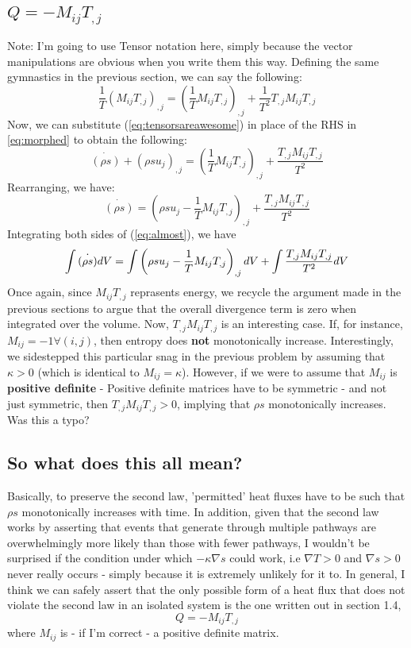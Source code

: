 \documentclass[english]{article}
\begin{document}
\subsection{$Q = - M_{ij} T_{,j}$}
Note: I'm going to use Tensor notation here, simply because the vector
manipulations are obvious when you write them this way.
Defining the same gymnastics in the previous section, we can say the 
following:
\begin{equation}
	\frac{1}{T}\left(M_{ij}T_{,j}\right)_{,j} = 
	\left(\frac{1}{T}M_{ij}T_{,j}\right)_{,j} 
	+\frac{1}{T^{2}}T_{,j}M_{ij}T_{,j}
	\label{eq:tensorsareawesome}
\end{equation}
Now, we can substitute (\ref{eq:tensorsareawesome}) in place of the RHS in
\ref{eq:morphed} to obtain the following:
$$
	\dot{(\rho s)}+(\rho su_{j})_{,j}=\left(\frac{1}{T}M_{ij}T_{,j}\right)_{,j}  
	+\frac{T_{,j}M_{ij}T_{,j}}{T^{2}}
$$
Rearranging, we have:
\begin{equation}
	\dot{(\rho s)}=\left(\rho su_{j}-\frac{1}{T}M_{ij}T_{,j}\right)_{,j}  
	+\frac{T_{,j}M_{ij}T_{,j}}{T^{2}}
	\label{eq:almost}
\end{equation}
Integrating both sides of (\ref{eq:almost}), we have
$$
	\intop \dot{(\rho s)}dV=
	\intop \left(\rho su_{j}-\frac{1}{T}M_{ij}T_{,j}\right)_{,j} dV  
	+ \intop \frac{T_{,j}M_{ij}T_{,j}}{T^{2}} dV
$$
Once again, since $M_{ij}T_{,j}$ reprasents energy, we recycle the argument
made in the previous sections to argue that the overall divergence term is 
zero when integrated over the volume.
Now, $T_{,j}M_{ij}T_{,j}$ is an interesting case. 
If, for instance, 
$M_{ij} = -1 \forall (i,j)$, then entropy does \textbf{not} monotonically
increase.
Interestingly, we sidestepped this particular snag in the previous problem
by assuming that $\kappa > 0$ (which is identical to $M_{ij}=\kappa$). 
However, if we were to assume that $M_{ij}$ is \textbf{positive definite} -
Positive definite matrices have to be symmetric - and not just symmetric, 
then $T_{,j}M_{ij}T_{,j} > 0$, implying that $\rho s$ monotonically
increases.
Was this a typo? 
\subsection{So what does this all mean?}
Basically, to preserve the second law, 'permitted' heat fluxes have to be
such that $\rho s$ monotonically increases with time.
In addition, given that the second law works by asserting that events that
generate through multiple pathways are overwhelmingly more likely than those
with fewer pathways, I wouldn't be surprised if the condition under which
$-\kappa\nabla s$ could work, i.e $\nabla T > 0$ and $\nabla s > 0$ never
really occurs - simply because it is extremely unlikely for it to.
In general, I think we can safely assert that the only possible form of a
heat flux that does not violate the second law in an isolated system is
the one written out in section 1.4, 
$$ Q = -M_{ij}T_{,j} $$
where $M_{ij}$ is - if I'm correct - a positive definite matrix.
\end{document}
